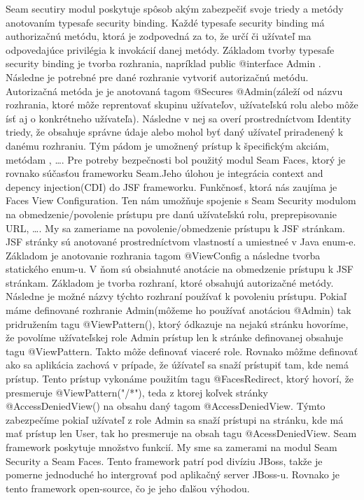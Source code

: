 Seam secutiry modul poskytuje spôsob akým zabezpečiť svoje triedy a metódy anotovaním typesafe security binding. Každé typesafe security binding má authorizačnú metódu, ktorá je zodpovedná za to, že určí či užívateľ ma odpovedajúce privilégia k invokácií danej metódy. Základom tvorby typesafe security binding je tvorba rozhrania, napríklad public @interface Admin { }. Následne je potrebné pre dané rozhranie vytvoriť autorizačnú metódu. Autorizačná  metóda je je anotovaná tagom @Secures @Admin(záleží od názvu rozhrania, ktoré môže reprentovať skupinu užívateľov, užívateľskú rolu alebo môže ísť aj o konkrétneho užívateľa). Následne v nej sa overí prostredníctvom Identity triedy, že obsahuje správne údaje alebo mohol byť daný užívateľ priradenený k danému rozhraniu. Tým pádom je umožnený prístup k špecifickým akciám, metódam , \ldots. Pre potreby bezpečnosti bol použitý modul Seam Faces, ktorý je rovnako súčasťou frameworku Seam.Jeho úlohou je integrácia context and depency injection(CDI) do JSF frameworku. Funkčnosť, ktorá nás zaujíma je Faces View Configuration. Ten nám umožňuje spojenie s Seam Security modulom na obmedzenie/povolenie prístupu pre danú užívateľskú rolu, preprepisovanie URL, \ldots. My sa zameriame na povolenie/obmedzenie prístupu k JSF stránkam. JSF stránky sú anotované prostredníctvom vlastností a umiestneé v Java enum-e. Základom je anotovanie rozhrania tagom @ViewConfig a následne tvorba statického enum-u. V ňom sú obsiahnuté anotácie na obmedzenie prístupu k JSF stránkam. Základom je tvorba rozhraní, ktoré obsahujú autorizačné metódy. Následne je možné názvy týchto rozhraní používať k povoleniu prístupu. Pokiaľ máme definované rozhranie Admin(môžeme ho používať anotáciou @Admin) tak pridružením tagu @ViewPattern(), ktorý ódkazuje na nejakú stránku hovoríme, že povolíme užívateľskej role Admin prístup len k stránke definovanej obsahuje tagu @ViewPattern. Takto môže definovať viaceré role. Rovnako môžme definovať ako sa aplikácia zachová v prípade, že úžívateľ sa snaží prístupiť tam, kde nemá prístup. Tento prístup vykonáme použitím tagu @FacesRedirect, ktorý hovorí, že presmeruje @ViewPattern("/*"), teda z ktorej koľvek stránky @AccessDeniedView() na obsahu daný tagom @AccessDeniedView. Týmto zabezpečíme pokiaľ užívateľ z role Admin sa snaží prístupi na stránku, kde má mať prístup len User, tak ho presmeruje na obsah tagu @AcessDeniedView. Seam framework poskytuje množstvo funkcií. My sme sa zamerami na modul Seam Security a Seam Faces. Tento framework patrí pod divíziu JBoss, takže je pomerne jednoduché ho intergrovať pod aplikačný server JBoss-u. Rovnako je tento framework open-source, čo je jeho ďalšou výhodou.


